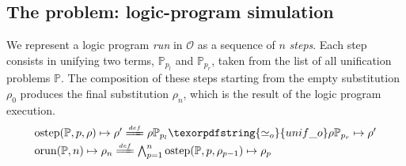 \documentclass[sigconf,natbib=false,review]{acmart}
\newcommand{\UnifRel}{\ensuremath{\simeq}}
\newcommand{\Uo}{\texorpdfstring{\ensuremath{\UnifRel_o}\xspace}{unif\_o}}
\newcommand{\Ue}{\ensuremath{\UnifRel_m}\xspace}
\newcommand{\Fo}{\texorpdfstring{\ensuremath{\mathcal{O}\xspace}}{O}} %
\newcommand{\foUnifPb}{\ensuremath{\mathbb{P}}\xspace}
\begin{document}
\subsection{The problem: logic-program simulation}
We represent a logic program \emph{run} in \Fo{} as
a sequence of $n$ \emph{steps}. Each step consists in
unifying two terms, $\foUnifPb_{p_l}$ and
$\foUnifPb_{p_r}$, taken from the list of all unification
problems \foUnifPb.
The composition of these steps starting from the
empty substitution $\rho_0$ produces the final
substitution $\rho_n$, which is the result of the
logic program execution.
%
\newcommand{\C}[4]{\ensuremath{\langle #1 \rangle}\mapsto(#2,#3,#4)}
\newcommand{\D}[4]{\ensuremath{\langle #1,#2,#3 \rangle^{-1}\mapsto #4}}
\newcommand{\progress}{\ensuremath{\mathrm{progress}}\xspace}
\newcommand{\fstep}{\ensuremath{\mathrm{ostep}}\xspace}
\newcommand{\hstep}{\ensuremath{\mathrm{mstep}}\xspace}
\newcommand{\frun}{\ensuremath{\mathrm{orun}}\xspace}
\newcommand{\hrun}{\ensuremath{\mathrm{mrun}}\xspace}
\newcommand{\stepF}[4]{\ensuremath{\fstep(#1,#2,#3) \mapsto #4}}
\newcommand{\stepFD}[4]{%
\ensuremath{#3 #1_{#2_l} \Uo #3 #1_{#2_r} \mapsto #4}}
\newcommand{\stepH}[6]{\ensuremath{\hstep(#1,#2,#3,#4) \mapsto (#5, #6)}}
\newcommand{\stepHD}[6]{\ensuremath{%
#3 #1_{#2_l} \Ue #3 #1_{#2_r} \mapsto #4 \land \progress(#6,#4) \mapsto (#6',#5)}}
\newcommand{\runF}[3]{\ensuremath{\frun(#1,#2) \mapsto #3_{#2}}}
\newcommand{\runFx}[3]{\ensuremath{\frun(#1,#2) \mapsto #3}}
\newcommand{\runFD}[2]{\ensuremath{%
\bigwedge_{p = 1}^{#2} \stepF{#1}{p}{\rho_{p-1}}{\rho_{p}}}}
\newcommand{\runH}[3]{\ensuremath{\hrun(#1,#2) \mapsto #3_{#2}}}
\newcommand{\runHx}[3]{\ensuremath{\hrun(#1,#2) \mapsto #3}}
\newcommand{\runHD}[3]{\ensuremath{%
\bigwedge_{p = 1}^{#2} \stepH{#1}{p}{\sigma_{p-1}}{#3_{p-1}}{\sigma_{p}}{#3_p}}}
\newcommand{\deff}{\ensuremath{\stackrel{{\scriptscriptstyle def}}{=\!=\!\!\!=}}}
%
$$
\begin{array}{l}
\stepF{\foUnifPb}{p}{\rho}{\rho'}
\deff
\stepFD{\foUnifPb}{p}{\rho}{\rho'}\vspace{2pt}\\
\runF{\foUnifPb}{n}{\rho}
\deff
\runFD{\foUnifPb}{n}
\end{array}
$$
\end{document}
